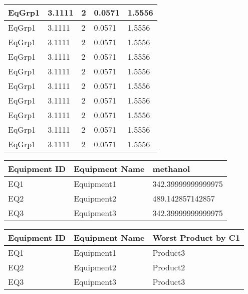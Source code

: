 \documentclass{article}
\begin{document}
\begin{longtable}[l]{|p{1.5cm}|p{3cm}|p{3cm}|p{3cm}|p{3cm}|}
\hline
EqGrp1 & 3.1111 & 2 & 0.0571 & 1.5556\\
\hline
EqGrp1 & 3.1111 & 2 & 0.0571 & 1.5556\\
\hline
EqGrp1 & 3.1111 & 2 & 0.0571 & 1.5556\\
\hline
EqGrp1 & 3.1111 & 2 & 0.0571 & 1.5556\\
\hline
EqGrp1 & 3.1111 & 2 & 0.0571 & 1.5556\\
\hline
EqGrp1 & 3.1111 & 2 & 0.0571 & 1.5556\\
\hline
EqGrp1 & 3.1111 & 2 & 0.0571 & 1.5556\\
\hline
EqGrp1 & 3.1111 & 2 & 0.0571 & 1.5556\\
\hline
EqGrp1 & 3.1111 & 2 & 0.0571 & 1.5556\\
\hline
EqGrp1 & 3.1111 & 2 & 0.0571 & 1.5556\\
\hline

    \end{longtable}
    
        \begin{longtable}[l]{|p{1.5cm}|p{2cm}|p{2cm}|}

\hline
Equipment ID & Equipment Name & methanol\\
\hline

EQ1 & Equipment1 & 342.39999999999975\\
\hline
EQ2 & Equipment2 & 489.142857142857\\
\hline
EQ3 & Equipment3 & 342.39999999999975\\
\hline

    \end{longtable}
    
        \begin{longtable}[l]{|p{3cm}|p{3cm}|p{3cm}|}

\hline
Equipment ID & Equipment Name & Worst Product by C1\\
\hline

EQ1 & Equipment1 & Product3\\
\hline
EQ2 & Equipment2 & Product2\\
\hline
EQ3 & Equipment3 & Product3\\
\hline

    \end{longtable}
    
        
\end{document}
